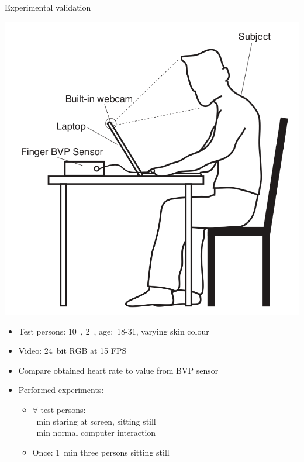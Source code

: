\documentclass{beamer}
\begin{document}
\begin{frame}{Experimental validation}
	\begin{minipage}{0.3\textwidth}
		\includegraphics[width=\textwidth]{setup.png}
	\end{minipage} \pause
	\begin{minipage}{0.65\textwidth}
		\begin{itemize}
			\item Test persons: 10~\male, 2~\female, age:~18-31, varying skin colour \pause
			\item Video: 24~bit RGB at 15 FPS \pause
			\item Compare obtained heart rate to value from BVP sensor \pause
			\item Performed experiments: \pause
				\begin{itemize}[label=-]
					\item $\forall$ test persons:\\ ~min staring at screen, sitting still\\ ~min normal computer interaction \pause
					\item Once: 1~min three persons sitting still
				\end{itemize}
		\end{itemize}
\end{minipage}
\end{frame}
\end{document}
